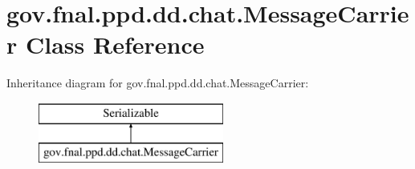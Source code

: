 \hypertarget{classgov_1_1fnal_1_1ppd_1_1dd_1_1chat_1_1MessageCarrier}{\section{gov.\-fnal.\-ppd.\-dd.\-chat.\-Message\-Carrier Class Reference}
\label{classgov_1_1fnal_1_1ppd_1_1dd_1_1chat_1_1MessageCarrier}
}
Inheritance diagram for gov.\-fnal.\-ppd.\-dd.\-chat.\-Message\-Carrier\-:\begin{figure}[H]
\begin{center}
\leavevmode
\includegraphics[height=2.000000cm]{classgov_1_1fnal_1_1ppd_1_1dd_1_1chat_1_1MessageCarrier}
\end{center}
\end{figure}
